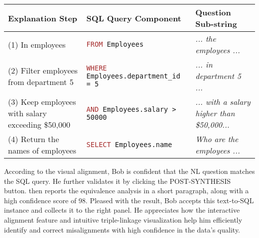 \begin{table*}[htbp]
\centering
\small
\begin{tabularx}{\textwidth}{>{\raggedright\arraybackslash}p{}>{\raggedright\arraybackslash}p{}>{\raggedright\arraybackslash}X}
\toprule
\textbf{Explanation Step} & \textbf{SQL Query Component} & \textbf{Question Sub-string} \\
\midrule
(1) In employees & \texttt{\textcolor{brown}{FROM} Employees} & \textit{... the employees ...} \\
(2) Filter employees from department 5 & \texttt{\textcolor{brown}{WHERE} Employees.department\_id = 5} & \textit{... in department 5 ...} \\
(3) Keep employees with salary exceeding \$50,000 & \texttt{\textcolor{brown}{AND} Employees.salary > 50000} & \textit{... with a salary higher than \$50,000...} \\
(4) Return the names of employees & \texttt{\textcolor{brown}{SELECT} Employees.name} & \textit{Who are the employees ...} \\
\bottomrule
\end{tabularx}
\label{tab:mapping}
\end{table*}


According to the visual alignment, Bob is confident that the NL question matches the SQL query. He further validates it by clicking the POST-SYNTHESIS button. 
{\tool} then reports the equivalence analysis in a short paragraph, along with a high confidence score of 98. Pleased with the result, Bob accepts this text-to-SQL instance and collects it to the right panel. He appreciates how the interactive alignment feature and intuitive triple-linkage visualization help him efficiently identify and correct misalignments with high confidence in the data's quality.

